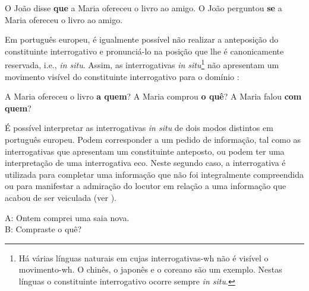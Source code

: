 \documentclass[output=paper]{LSP/langsci}
\begin{document}
\ea\label{ex:lobo_7}
\ea\label{ex:lobo_7a} O João disse \textbf{que} a Maria ofereceu o livro ao amigo.
\ex\label{ex:lobo_7b} O João perguntou \textbf{se} a Maria ofereceu o livro ao amigo.
\zl

Em português europeu, é igualmente possível não realizar a anteposição do constituinte interrogativo e pronunciá-lo na posição que lhe é canonicamente reservada, i.e., \textit{in situ}. Assim, as interrogativas \textit{in situ}\footnote{Há várias línguas naturais em cujas interrogativas-wh não é visível o movimento-wh. O chinês, o japonês e o coreano são um exemplo. Nestas línguas o constituinte interrogativo ocorre sempre \textit{in situ}.} não apresentam um movimento visível do constituinte interrogativo para o domínio :

\ea\label{ex:lobo_8}
\ea\label{ex:lobo_8a} A Maria ofereceu o livro \textbf{a quem}?
\ex\label{ex:lobo_8b} A Maria comprou \textbf{o quê}?
\ex\label{ex:lobo_8c} A Maria falou \textbf{com quem}?
\zl

É possível interpretar as interrogativas \textit{in situ} de dois modos distintos em português europeu. Podem corresponder a um pedido de informação, tal como as interrogativas que apresentam um constituinte anteposto, ou podem ter uma interpretação de uma interrogativa eco. Neste segundo caso, a interrogativa é utilizada para completar uma informação que não foi integralmente compreendida ou para manifestar a admiração do locutor em relação a uma informação que acabou de ser veiculada (ver \citealt{mateus_etal2003}).

\ea\label{ex:lobo_9} A: Ontem comprei uma saia nova.\\B: Compraste o quê?\z
\end{document}
